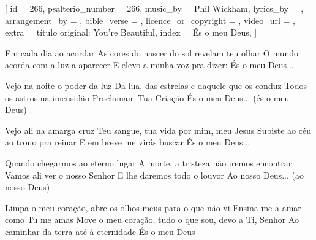 [
    id                     = {266},
    psalterio_number       = {266},
    music_by               = {Phil Wickham},
    lyrics_by              = {},
    arrangement_by         = {},
    bible_verse            = {},
    licence_or_copyright   = {},
    video_url              = {},
    extra                  = {título original: You’re Beautiful},
    index                  = {És o meu Deus},
]


\beginverse
Em cada dia ao acordar
As cores do nascer do sol revelam teu olhar
O mundo acorda com a luz a aparecer
E elevo a minha voz pra dizer:
És o meu Deus...
\endverse


\beginverse
Vejo na noite o poder da luz
Da lua, das estrelas e daquele que os conduz
Todos os astros na imensidão
Proclamam Tua Criação
És o meu Deus... (és o meu Deus)
\endverse


\beginverse
Vejo ali na amarga cruz
Teu sangue, tua vida por mim, meu Jesus
Subiste ao céu ao trono pra reinar
E em breve me virás buscar
És o meu Deus...
\endverse


\beginverse
Quando chegarmos ao eterno lugar
A morte, a tristeza não iremos encontrar
Vamos ali ver o nosso Senhor
E lhe daremos todo o louvor
Ao nosso Deus... (ao nosso Deus)
\endverse


\beginverse
Limpa o meu coração, abre os olhos meus para o que não vi
Ensina-me a amar como Tu me amas
Move o meu coração, tudo o que sou, devo a Ti, Senhor
Ao caminhar da terra até à eternidade
És o meu Deus
\endverse

\endsong
